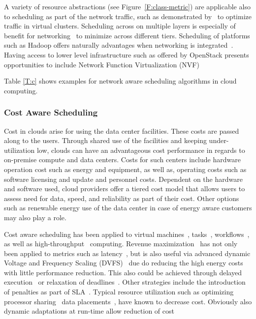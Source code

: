 \documentclass[final,5p,times,twocolumn]{elsarticle}
\begin{document}
A variety of resource abstractions (see Figure~\ref{F:class-metric}) are
applicable also to scheduling as part of the network traffic, such as
demonstrated by~\cite{yu2017survivable} to optimize traffic in virtual
clusters.  Scheduling across on multiple layers is especially of
benefit for networking~\cite{bi2015sla} to minimize across different
tiers.  Scheduling of platforms such as Hadoop offers naturally
advantages when networking is integrated~\cite{kondikoppa2012network}.  Having access to lower level infrastructure
such as offered by OpenStack presents opportunities to include Network
Function Virtualization (NVF)~\cite{lucrezia2015introducing}

Table \ref{T:c} shows examples for network aware scheduling algorithms
in cloud computing.






\subsubsection{Cost Aware Scheduling}\label{sec:cost}


Cost in clouds arise for using the data center facilities. These costs
are passed along to the users. Through shared use of the facilities
and keeping under-utilization low, clouds can have an advantageous
cost performance in regards to on-premise compute and data
centers. Costs for such centers include hardware operation cost such
as energy and equipment, as well as, operating costs such as software
licensing and update and personnel costs. Dependent on the hardware
and software used, cloud providers offer a tiered cost model that
allows users to assess need for data, speed, and reliability as part
of their cost.  Other options such as renewable energy use of the data
center in case of energy aware customers may also play a role.

Cost aware scheduling has been applied to virtual
machines~\cite{yuan2017ttsa},
tasks~\cite{yuan2017temporal,zuo2015multi},
workflows~\cite{arabnejad2015cost,arabnejad2016budget}, as well as
high-throughput~\cite{yuan2016cawsac} computing.  Revenue
maximization~\cite{yuan2018warm} has not only been applied to metrics
such as latency~\cite{ghahramani2017toward}, but is also useful via
advanced dynamic Voltage and Frequency Scaling
(DVFS)~\cite{las10cloudsched,calheiros2014energy} due do reducing the
high energy costs with little performance reduction. This also could
be achieved through delayed execution~\cite{bi2016trs} or relaxation
of deadlines~\cite{zhang2018dynamic}.  Other strategies include the
introduction of penalties as part of SLA~\cite{wu2012sla}. Typical
resource utilization such as optimizing processor
sharing~\cite{lee2012profit} data placements~\cite{lee2012profit},
have known to decrease cost. Obviously also dynamic
adaptations at run-time allow reduction of cost~\cite{ari2013design}
\end{document}
